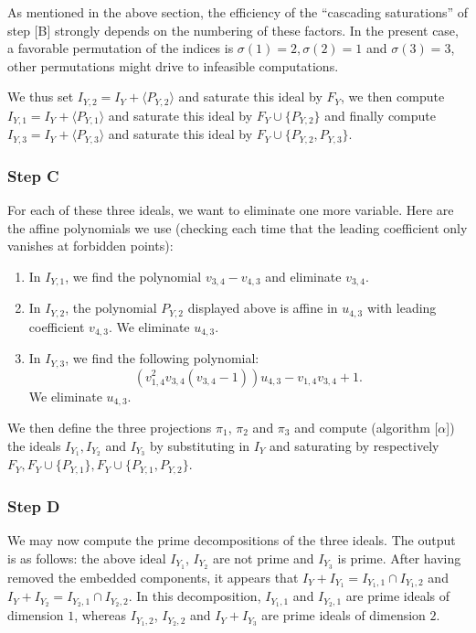 As mentioned in the above section, the efficiency of the ``cascading
saturations'' of step [B] strongly depends on the numbering of these factors.
In the present case, a favorable permutation of the indices is $\sigma ( 1 ) =2,
\sigma ( 2 ) =1$ and $\sigma ( 3 ) =3$, other permutations might drive to
infeasible computations.

We thus set $I_{Y,2} =I_{Y} + \langle P_{Y,2} \rangle$ and saturate this ideal
by $F_{Y}$, we then compute $I_{Y,1} =I_{Y} + \langle P_{Y,1} \rangle$ and
saturate this ideal by $F_{Y} \cup \{ P_{Y,2} \}$ and finally compute $I_{Y,3}
=I_{Y} + \langle P_{Y,3} \rangle$ and saturate this ideal by $F_{Y} \cup \{
P_{Y,2} ,P_{Y,3} \}$.

\subsubsection{{\bf Step C}}

For each of these three ideals, we want to eliminate one more variable. Here are the affine polynomials we use (checking each time that the leading coefficient only vanishes at forbidden points):
\begin{enumerate}
\item In $I_{Y,1}$, we find the polynomial $v_{3,4} -v_{4,3}$ and eliminate $v_{3,4}$.
\item
In $I_{Y,2}$, the polynomial $P_{Y,2}$ displayed above is affine in $u_{4,3}$ with leading coefficient $v_{4,3}$. We eliminate $u_{4,3}$.
\item In $I_{Y,3}$, we find the following polynomial: 
$$\left(v_{1,4}^{2}v_{3,4}(v_{3,4}-1)\right) u_{4,3} -v_{1,4} v_{3,4} +1.$$ We eliminate $u_{4,3}$.
\end{enumerate}
We then define the three projections $\pi_{1}$, $\pi_{2}$ and  $\pi_{3}$ and compute (algorithm [$\alpha$]) the ideals
$I_{Y_{1}} ,I_{Y_{2}}$ and $I_{Y_{3}}$ by
substituting in $I_{Y}$ and saturating by respectively $F_{Y} ,F_{Y} \cup \{
P_{Y,1} \} ,F_{Y} \cup \{ P_{Y,1} ,P_{Y,2} \}$.

\subsubsection{{\bf Step D}}

We may now compute the prime decompositions of the three ideals. The output is as follows: the above ideal
$I_{Y_{1}}$, $I_{Y_{2}}$ are not prime and $I_{Y_{3}}$ is prime. After having
removed the embedded components, it appears that $I_{Y} +I_{Y_{1}} =I_{Y_{1}
,1} \cap I_{Y_{1} ,2}$ and $I_{Y} +I_{Y_{2}} =I_{Y_{2} ,1} \cap I_{Y_{2} ,2}$. In this decomposition,
$I_{Y_{1} ,1}$ and $I_{Y_{2} ,1}$ are prime ideals of dimension $1$, whereas $I_{Y_{1} ,2}$, $I_{Y_{2} ,2}$ and $I_{Y} +I_{Y_{3}}$ are prime ideals of dimension $2$.


